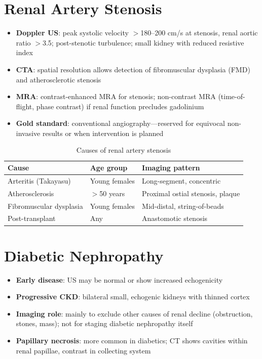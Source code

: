 \section{Renal Artery Stenosis}
\begin{itemize}
  \item \textbf{Doppler US}: peak systolic velocity $>$180--200 cm/s at stenosis, renal aortic ratio $>$3.5; post-stenotic turbulence; small kidney with reduced resistive index
  \item \textbf{CTA}: spatial resolution allows detection of fibromuscular dysplasia (FMD) and atherosclerotic stenosis
  \item \textbf{MRA}: contrast-enhanced MRA for stenosis; non-contrast MRA (time-of-flight, phase contrast) if renal function precludes gadolinium
  \item \textbf{Gold standard}: conventional angiography---reserved for equivocal non-invasive results or when intervention is planned
\end{itemize}

\begin{table}[h]
\centering
\caption{Causes of renal artery stenosis}
\begin{tabular}{|l|l|l|}
\hline
\textbf{Cause} & \textbf{Age group} & \textbf{Imaging pattern} \\
\hline
Arteritis (Takayasu) & Young females & Long-segment, concentric \\
Atherosclerosis & $>$50 years & Proximal ostial stenosis, plaque \\
Fibromuscular dysplasia & Young females & Mid-distal, string-of-beads \\
Post-transplant & Any & Anastomotic stenosis \\
\hline
\end{tabular}
\end{table}

\section{Diabetic Nephropathy}
\begin{itemize}
  \item \textbf{Early disease}: US may be normal or show increased echogenicity
  \item \textbf{Progressive CKD}: bilateral small, echogenic kidneys with thinned cortex
  \item \textbf{Imaging role}: mainly to exclude other causes of renal decline (obstruction, stones, mass); not for staging diabetic nephropathy itself
  \item \textbf{Papillary necrosis}: more common in diabetics; CT shows cavities within renal papillae, contrast in collecting system
\end{itemize}

